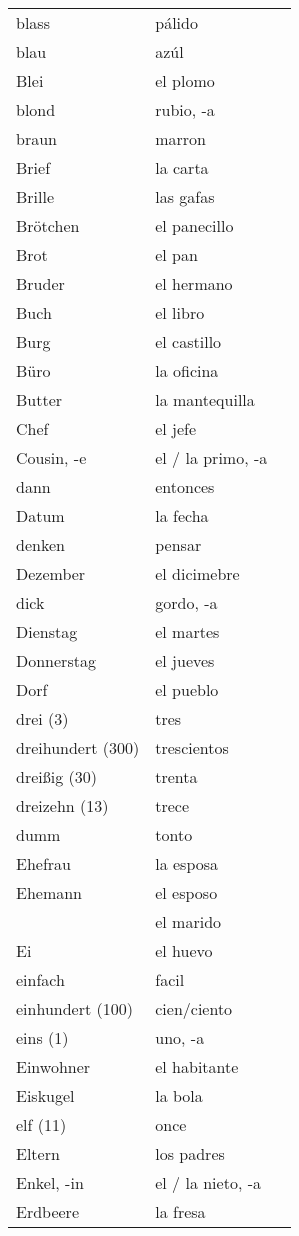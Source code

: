 \documentclass[10pt,spanish]{article}
\begin{document}
\begin{longtable}{p{} p{} | p{}}
blass & pálido \\
blau & azúl \\
Blei & el plomo  \\
blond & rubio, -a  \\
braun & marron  \\
Brief & la carta  \\
Brille & las gafas  \\
Brötchen & el panecillo  \\
Brot & el pan \\
Bruder & el hermano  \\
Buch & el libro  \\
Burg & el castillo \\
Büro & la oficina \\
Butter & la mantequilla  \\
Chef & el jefe  \\
Cousin, -e & el / la primo, -a  \\
dann & entonces  \\
Datum & la fecha  \\
denken & pensar  \\
Dezember & el dicimebre  \\
dick & gordo, -a  \\
Dienstag & el martes  \\
Donnerstag & el jueves  \\
Dorf & el pueblo  \\
drei (3) & tres  \\
dreihundert (300) & trescientos \\
dreißig (30) & trenta  \\
dreizehn (13) & trece  \\
dumm & tonto  \\
Ehefrau & la esposa  \\
Ehemann & el esposo \\
& el marido \\
Ei & el huevo  \\
einfach & facil  \\
einhundert (100) & cien/ciento  \\
eins (1) & uno, -a  \\
Einwohner & el habitante \\
Eiskugel & la bola  \\
elf (11) & once  \\
Eltern & los padres  \\
Enkel, -in & el / la nieto, -a  \\
Erdbeere & la fresa  \\

\end{longtable}
\end{document}
